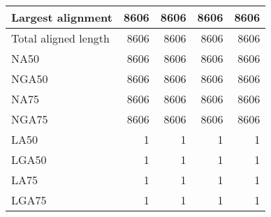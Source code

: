 \documentclass[12pt,a4paper]{article}
\begin{document}
\begin{table}[ht]
\begin{center}
\begin{tabular}{|l*{4}{|r}|}
Largest alignment & 8606 & 8606 & 8606 & 8606 \\ \hline
Total aligned length & 8606 & 8606 & 8606 & 8606 \\ \hline
NA50 & 8606 & 8606 & 8606 & 8606 \\ \hline
NGA50 & 8606 & 8606 & 8606 & 8606 \\ \hline
NA75 & 8606 & 8606 & 8606 & 8606 \\ \hline
NGA75 & 8606 & 8606 & 8606 & 8606 \\ \hline
LA50 & 1 & 1 & 1 & 1 \\ \hline
LGA50 & 1 & 1 & 1 & 1 \\ \hline
LA75 & 1 & 1 & 1 & 1 \\ \hline
LGA75 & 1 & 1 & 1 & 1 \\ \hline
\end{tabular}
\end{center}
\end{table}
\end{document}
